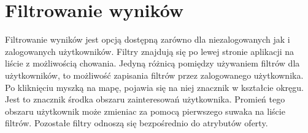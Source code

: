 
\section{Filtrowanie wyników}
Filtrowanie wyników jest opcją dostępną zarówno dla niezalogowanych jak i zalogowanych użytkowników. Filtry znajdują się po lewej stronie aplikacji na liście z możliwością chowania. Jedyną różnicą pomiędzy używaniem filtrów dla użytkowników, to możliwość zapisania filtrów przez zalogowanego użytkownika. Po kliknięciu myszką na mapę, pojawia się na niej znacznik w kształcie okręgu. Jest to znacznik środka obszaru zainteresowań użytkownika. Promień tego obszaru użytkownik może zmieniac za pomocą pierwszego suwaka na liście filtrów. Pozostałe filtry odnoszą się bezpośrednio do atrybutów oferty.\\
\\
\begin{minipage}{\linewidth}
\label{filters}
\end{minipage}\\ 


